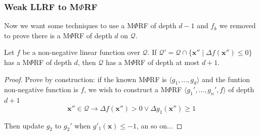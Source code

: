 \documentclass[11pt]{beamer}
\begin{document}
\begin{frame}\frametitle{Weak LLRF to M$\Phi$RF}
Now we want some techniques to use a M$\Phi$RF of depth $d - 1$ and $f_k$ we removed to prove there is a M$\Phi$RF of depth $d$ on $\mathcal{Q}$. 
\begin{lemma}[2]
Let $f$ be a non-negative linear function over $\mathcal{Q}$. If $\mathcal{Q}' = \mathcal{Q}\cap \{\textbf{x} '' \mid \Delta f(\textbf{x} '') \le 0\}$ has a M$\Phi$RF of depth $d$, then $\mathcal{Q}$ has a M$\Phi$RF of depth at most $d + 1$.
\end{lemma}
\begin{proof}
Prove by construction: if the known M$\Phi$RF is $\langle g_1, \ldots, g_d \rangle$ and the funtion non-negative function is $f$, we wish to construct a  M$\Phi$RF $\langle g_1', \ldots, g_n', f\rangle$ of depth $d + 1$
\[\textbf{x}''\in \mathcal{Q} \rightarrow \Delta f(\textbf{x}'') > 0 \vee \Delta g_1(\textbf{x}'') \ge 1\]

Then update $g_2$ to $g_2'$ when $g'_1(\textbf{x}) \le -1$, an so on...

\end{proof}

\end{frame}
\end{document}
